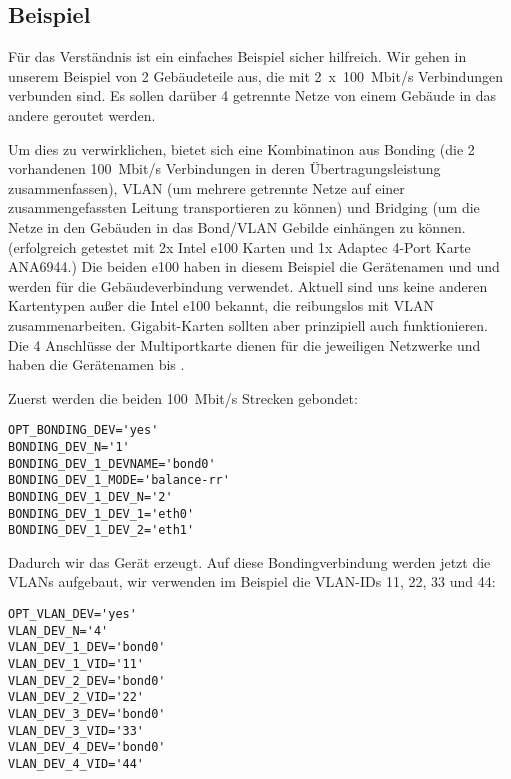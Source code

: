 \subsection{Beispiel}

Für das Verständnis ist ein einfaches Beispiel sicher hilfreich. Wir
gehen in unserem Beispiel von 2 Gebäudeteile aus, die mit 2~x~100~Mbit/s
Verbindungen verbunden sind. Es sollen darüber 4 getrennte Netze von
einem Gebäude in das andere geroutet werden.

Um dies zu verwirklichen, bietet sich eine Kombinatinon aus Bonding
(die 2 vorhandenen 100~Mbit/s Verbindungen in deren Übertragungsleistung
zusammenfassen), VLAN (um mehrere getrennte Netze auf einer
zusammengefassten Leitung transportieren zu können) und Bridging (um
die Netze in den Gebäuden in das Bond/VLAN Gebilde einhängen zu können.
(erfolgreich getestet mit 2x Intel e100 Karten und 1x Adaptec 4-Port Karte ANA6944.)
Die beiden e100 haben in diesem Beispiel die Gerätenamen  und
 und werden für die Gebäudeverbindung verwendet.
Aktuell sind uns keine anderen Kartentypen außer die Intel e100
bekannt, die reibungslos mit VLAN zusammenarbeiten. Gigabit-Karten
sollten aber prinzipiell auch funktionieren.  Die 4 Anschlüsse der
Multiportkarte dienen für die jeweiligen Netzwerke und haben die
Gerätenamen  bis .

Zuerst werden die beiden 100~Mbit/s Strecken gebondet:

\begin{example}
\begin{verbatim}
OPT_BONDING_DEV='yes'
BONDING_DEV_N='1'
BONDING_DEV_1_DEVNAME='bond0'
BONDING_DEV_1_MODE='balance-rr'
BONDING_DEV_1_DEV_N='2'
BONDING_DEV_1_DEV_1='eth0'
BONDING_DEV_1_DEV_2='eth1'
\end{verbatim}
\end{example}

Dadurch wir das Gerät  erzeugt. Auf diese
Bondingverbindung werden jetzt die VLANs aufgebaut, wir verwenden im
Beispiel die VLAN-IDs 11, 22, 33 und 44:

\begin{example}
\begin{verbatim}
OPT_VLAN_DEV='yes'
VLAN_DEV_N='4'
VLAN_DEV_1_DEV='bond0'
VLAN_DEV_1_VID='11'
VLAN_DEV_2_DEV='bond0'
VLAN_DEV_2_VID='22'
VLAN_DEV_3_DEV='bond0'
VLAN_DEV_3_VID='33'
VLAN_DEV_4_DEV='bond0'
VLAN_DEV_4_VID='44'
\end{verbatim}
\end{example}

